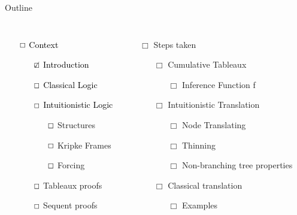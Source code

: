 \documentclass{beamer}
\begin{document}
\begin{frame}{Outline}
    \begin{columns}
        \begin{itemize}
            \item[$\textcolor{black}{\Box}$] \textcolor{black}{Context}
            \begin{itemize}
                \item[$\textcolor{black}{\CheckedBox}$] \textcolor{black}{Introduction}
                \item[$\textcolor{black}{\Box}$] \textcolor{black}{Classical Logic}
                \item[$\textcolor{black}{\Box}$] \textcolor{black}{Intuitionistic Logic}
                \begin{itemize}
                    \item[$\textcolor{black}\Box$] Structures
                    \item[$\textcolor{black}\Box$] Kripke Frames
                    \item[$\textcolor{black}\Box$] Forcing
                \end{itemize}
                \item[$\textcolor{black}\Box$] Tableaux proofs
                \item[$\textcolor{black}\Box$] Sequent proofs
            \end{itemize}
        \end{itemize}
        \begin{itemize}
            \item[${\Box}$] {Steps taken}
            \begin{itemize}
                \item[${\Box}$] {Cumulative Tableaux}
                \begin{itemize}
                    \item[${\Box}$] {Inference Function f}
                \end{itemize}
                \item[${\Box}$] {Intuitionistic Translation}
                \begin{itemize}
                    \item[${\Box}$] {Node Translating }
                    \item[${\Box}$] {Thinning }
                    \item[${\Box}$] {Non-branching tree properties}
                \end{itemize}
                \item[${\Box}$] {Classical translation}
                \begin{itemize}
                    \item[${\Box}$] {Examples}
                \end{itemize}
                
            \end{itemize}
        \end{itemize}
    \end{columns}
\end{frame}
\end{document}
